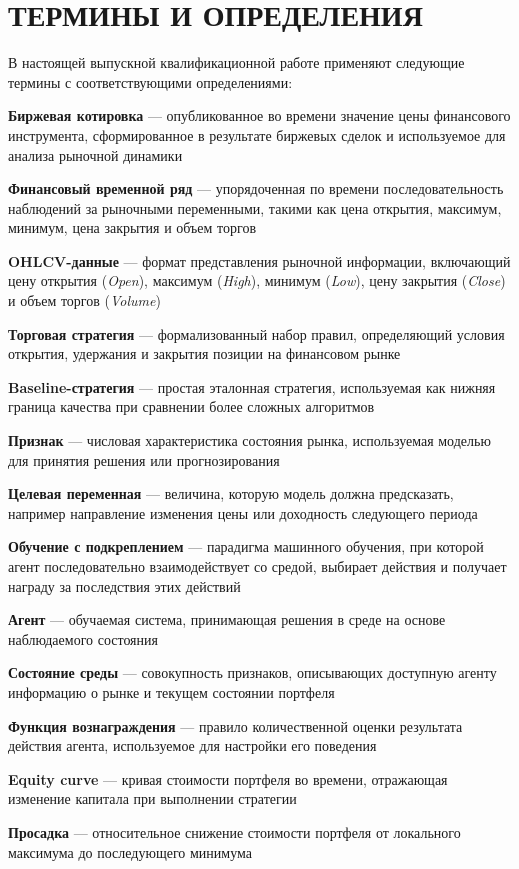 \clearpage
\section*{ТЕРМИНЫ И ОПРЕДЕЛЕНИЯ}

В настоящей выпускной квалификационной работе применяют следующие термины с соответствующими определениями:

\textbf{Биржевая котировка} — опубликованное во времени значение цены финансового инструмента, сформированное в результате биржевых сделок и используемое для анализа рыночной динамики

\textbf{Финансовый временной ряд} — упорядоченная по времени последовательность наблюдений за рыночными переменными, такими как цена открытия, максимум, минимум, цена закрытия и объем торгов

\textbf{OHLCV-данные} — формат представления рыночной информации, включающий цену открытия (\textit{Open}), максимум (\textit{High}), минимум (\textit{Low}), цену закрытия (\textit{Close}) и объем торгов (\textit{Volume})

\textbf{Торговая стратегия} — формализованный набор правил, определяющий условия открытия, удержания и закрытия позиции на финансовом рынке

\textbf{Baseline-стратегия} — простая эталонная стратегия, используемая как нижняя граница качества при сравнении более сложных алгоритмов

\textbf{Признак} — числовая характеристика состояния рынка, используемая моделью для принятия решения или прогнозирования

\textbf{Целевая переменная} — величина, которую модель должна предсказать, например направление изменения цены или доходность следующего периода

\textbf{Обучение с подкреплением} — парадигма машинного обучения, при которой агент последовательно взаимодействует со средой, выбирает действия и получает награду за последствия этих действий

\textbf{Агент} — обучаемая система, принимающая решения в среде на основе наблюдаемого состояния

\textbf{Состояние среды} — совокупность признаков, описывающих доступную агенту информацию о рынке и текущем состоянии портфеля

\textbf{Функция вознаграждения} — правило количественной оценки результата действия агента, используемое для настройки его поведения

\textbf{Equity curve} — кривая стоимости портфеля во времени, отражающая изменение капитала при выполнении стратегии

\textbf{Просадка} — относительное снижение стоимости портфеля от локального максимума до последующего минимума
